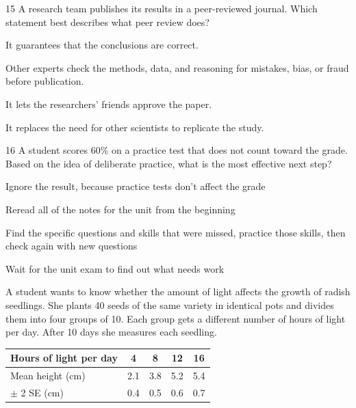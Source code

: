 \documentclass[11pt,letterpaper]{article}
\begin{document}
\begin{mcq}{15}
A research team publishes its results in a peer-reviewed journal. Which statement best describes what peer review does?
\begin{choices}
  \item It guarantees that the conclusions are correct.
  \item Other experts check the methods, data, and reasoning for mistakes, bias, or fraud before publication.
  \item It lets the researchers' friends approve the paper.
  \item It replaces the need for other scientists to replicate the study.
\end{choices}
\end{mcq}

\begin{mcq}{16}
A student scores 60\% on a practice test that does not count toward the grade. Based on the idea of deliberate practice, what is the most effective next step?
\begin{choices}
  \item Ignore the result, because practice tests don't affect the grade
  \item Reread all of the notes for the unit from the beginning
  \item Find the specific questions and skills that were missed, practice those skills, then check again with new questions
  \item Wait for the unit exam to find out what needs work
\end{choices}
\end{mcq}

\clearpage



A student wants to know whether the amount of light affects the growth of radish seedlings. She plants 40 seeds of the same variety in identical pots and divides them into four groups of 10. Each group gets a different number of hours of light per day. After 10 days she measures each seedling.

\begin{center}
\begin{tabular}{@{}lcccc@{}}
\toprule
Hours of light per day & 4 & 8 & 12 & 16 \\
\midrule
Mean height (cm) & 2.1 & 3.8 & 5.2 & 5.4 \\
$\pm$ 2 SE (cm) & 0.4 & 0.5 & 0.6 & 0.7 \\
\bottomrule
\end{tabular}
\end{center}
\end{document}
